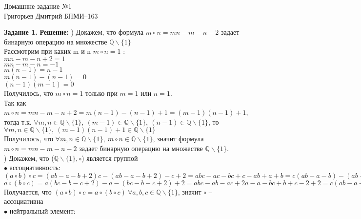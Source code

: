 \documentclass[12pt,a4paper]{scrartcl}
\begin{document}
	\begin{center}	
		Домашнне задание №1 \\
		Григорьев Дмитрий БПМИ--163
	\end{center}
	\textbf{Задание 1.}
	\newline
	\textbf{Решение:}
	\newline
	) Докажем, что формула $m \circ n = mn - m - n - 2$ задает бинарную операцию на множестве $\mathbb{Q} \backslash \{1\}$ \\
	Рассмотрим при каких m и n $m \circ n = 1$ : \\
	$mn - m - n + 2 = 1$ \\
	$mn - m - n = -1$ \\
	$m(n - 1) = n - 1$ \\
	$m(n - 1) - (n - 1) = 0$ \\	
	$(n - 1)(m - 1) = 0$ \\	
	Получилось, что $m \circ n = 1$ только при $m = 1$ или $n = 1$. \\
	Так как $m \circ n = mn - m - n + 2 = m(n - 1) - (n - 1) + 1 = (m - 1)(n - 1) + 1$, тогда т.к. $\forall m, n \in \mathbb{Q} \backslash \{1\},~(m - 1) \in \mathbb{Q} \backslash \{1\},~(n - 1) \in \mathbb{Q} \backslash \{1\}$, то \\
	 $\forall m, n \in \mathbb{Q} \backslash \{1\},~(m - 1)(n - 1) + 1\in \mathbb{Q} \backslash \{1\}$\\
	 Получилось, что $\forall m, n \in \mathbb{Q} \backslash \{1\},~m \circ n \in \mathbb{Q} \backslash \{1\}$, значит формула \\
	 $m \circ n = mn - m - n - 2$ задает бинарную операцию на множестве $\mathbb{Q} \backslash \{1\}$. \\
	 ) Докажем, что ($\mathbb{Q} \backslash \{1\}, \circ$) является группой \\
	 $\bullet$ ассоциативность: \\
	 $(a \circ b)\circ c = (ab - a - b + 2)c - (ab - a - b + 2) - c + 2 = abc - ac - bc + c - ab + a + b = c(ab - a - b) - (ab - a - b) + c = (ab - a - b)(c - 1) + c$ \\
	 $a \circ (b\circ c) = a(bc - b - c + 2) - a - (bc - b - c + 2) + 2 = abc - ab - ac + 2a - a - bc + b + c - 2 + 2 = c(ab - a - b) - (ab - a - b) + c = (ab - a - b)(c - 1) + c$ \\ 
	 Получается, что $(a \circ b) \circ c = a \circ (b \circ c) ~ \forall a, b, c \in \mathbb{Q} \backslash \{1\}$, значит $\circ$ -- ассоциативна\\
	 $\bullet$ нейтральный элемент: \\
\end{document}
